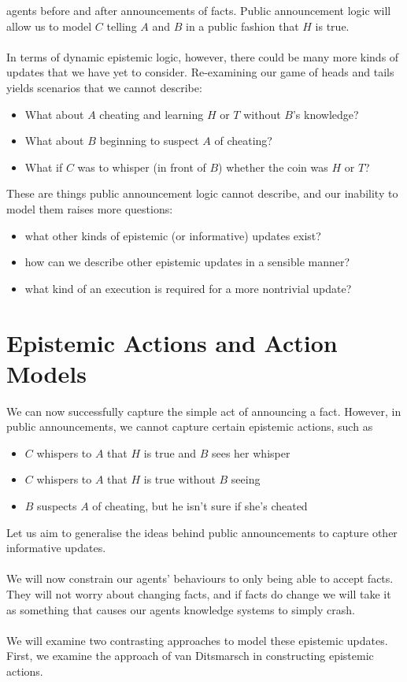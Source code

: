 \documentclass[12pt, a4paper, titlepage]{scrartcl}
\begin{document}
agents before and after announcements of facts.
Public announcement logic will allow us to model $C$ telling $A$ and $B$ in a
public fashion that $H$ is true.\\
\\
In terms of dynamic epistemic logic, however, there could be many more kinds of
updates that we have yet to consider.
Re-examining our game of heads and tails yields scenarios that we cannot
describe:
\begin{itemize}
	\item What about $A$ cheating and learning $H$ or $T$ without $B$'s knowledge?
	\item What about $B$ beginning to suspect $A$ of cheating?
	\item What if $C$ was to whisper (in front of $B$) whether the coin was $H$
	or $T$?
\end{itemize}
These are things public announcement logic cannot describe, and our inability to
model them raises more questions:
\begin{itemize}
	\item what other kinds of epistemic (or informative) updates exist?
	\item how can we describe other epistemic updates in a sensible manner?
	\item what kind of an execution is required for a more nontrivial update?
\end{itemize}

\section{Epistemic Actions and Action Models} \label{estAct}
We can now successfully capture the simple act of announcing a fact.
However, in public announcements, we cannot capture certain epistemic actions,
such as
\begin{itemize} 
  \item $C$ whispers to $A$ that $H$ is true and $B$ sees her whisper
  \item $C$ whispers to $A$ that $H$ is true without $B$ seeing
  \item $B$ suspects $A$ of cheating, but he isn't sure if she's cheated
\end{itemize}
Let us aim to generalise the ideas behind public announcements to capture other
informative updates.\\
\\
We will now constrain our agents' behaviours to only being able to accept facts.
They will not worry about changing facts, and if facts do change we will take it
as something that causes our agents knowledge systems to simply crash.\\
\\
We will examine two contrasting approaches to model these epistemic updates.
First, we examine the approach of van Ditsmarsch in constructing epistemic
actions.
\end{document}
